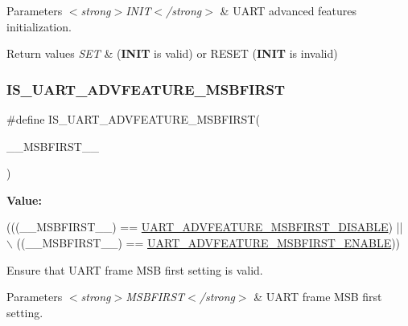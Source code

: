 \begin{DoxyParams}{Parameters}
{\em $<$strong$>$\+I\+N\+I\+T$<$/strong$>$} & U\+A\+RT advanced features initialization. \\
\hline
\end{DoxyParams}

\begin{DoxyRetVals}{Return values}
{\em S\+ET} & ({\bfseries I\+N\+IT} is valid) or R\+E\+S\+ET ({\bfseries I\+N\+IT} is invalid) \\
\hline
\end{DoxyRetVals}
\mbox{\label{group___u_a_r_t___private___macros_ga82289de330949918b037acf94fb12aef}} 
\subsubsection{\texorpdfstring{I\+S\+\_\+\+U\+A\+R\+T\+\_\+\+A\+D\+V\+F\+E\+A\+T\+U\+R\+E\+\_\+\+M\+S\+B\+F\+I\+R\+ST}{IS\_UART\_ADVFEATURE\_MSBFIRST}}
{\footnotesize\ttfamily \#define I\+S\+\_\+\+U\+A\+R\+T\+\_\+\+A\+D\+V\+F\+E\+A\+T\+U\+R\+E\+\_\+\+M\+S\+B\+F\+I\+R\+ST(\begin{DoxyParamCaption}\item[{}]{\+\_\+\+\_\+\+M\+S\+B\+F\+I\+R\+S\+T\+\_\+\+\_\+ }\end{DoxyParamCaption})}

{\bfseries Value\+:}
\begin{DoxyCode}
(((\_\_MSBFIRST\_\_) == \hyperlink{group___u_a_r_t___m_s_b___first_gae606b5f132b17af40d58c7d41fad35a5}{UART\_ADVFEATURE\_MSBFIRST\_DISABLE}) || \(\backslash\)
                                                   ((\_\_MSBFIRST\_\_) == 
      \hyperlink{group___u_a_r_t___m_s_b___first_gafb917e79562ccd13909c13056b34302f}{UART\_ADVFEATURE\_MSBFIRST\_ENABLE}))
\end{DoxyCode}


Ensure that U\+A\+RT frame M\+SB first setting is valid. 


\begin{DoxyParams}{Parameters}
{\em $<$strong$>$\+M\+S\+B\+F\+I\+R\+S\+T$<$/strong$>$} & U\+A\+RT frame M\+SB first setting. \\
\hline
\end{DoxyParams}

